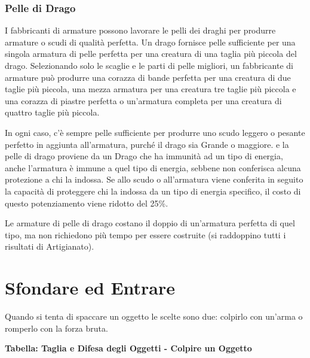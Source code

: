 \documentclass[a4paper,11pt,twoside,openany]{book}
\begin{document}
\subsubsection{Pelle di Drago}

\label{pelle-di-drago}

I fabbricanti di armature possono lavorare le pelli dei draghi per produrre armature o scudi di qualità perfetta.
Un drago fornisce pelle sufficiente per una singola armatura di pelle perfetta per una creatura di una taglia più piccola del drago. Selezionando solo le scaglie e le parti di pelle migliori, un fabbricante di armature può produrre una corazza di bande perfetta per una creatura di due taglie più piccola, una mezza armatura per una creatura tre taglie più piccola e una corazza di piastre perfetta o un'armatura completa per una creatura di quattro taglie più piccola.

In ogni caso, c'è sempre pelle sufficiente per produrre uno scudo leggero o pesante perfetto in aggiunta all'armatura, purché il drago sia Grande o maggiore.
e la pelle di drago proviene da un Drago che ha immunità ad un tipo di energia, anche l'armatura è immune a quel tipo di energia, sebbene non conferisca alcuna protezione a chi la indossa. Se allo scudo o all'armatura viene conferita in seguito la capacità di proteggere chi la indossa da un tipo di energia specifico, il costo di questo potenziamento viene ridotto del 25\%.

Le armature di pelle di drago costano il doppio di un'armatura perfetta di quel tipo, ma non richiedono più tempo per essere costruite (si raddoppino tutti i risultati di Artigianato).

\pagebreak

\section{Sfondare ed Entrare}

\label{sfondare-ed-entrare}

Quando si tenta di spaccare un oggetto le scelte sono due: colpirlo con un'arma o romperlo con la forza bruta.

\textbf{Tabella: Taglia e Difesa degli Oggetti - Colpire un Oggetto}
\medskip
\end{document}
